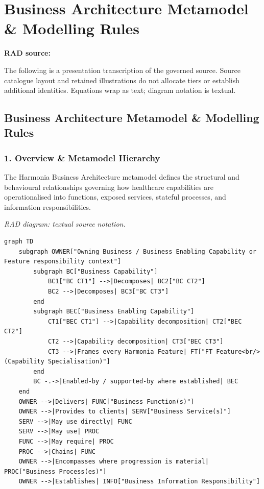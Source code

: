 \chapter{Business Architecture Metamodel \& Modelling Rules}\label{rad:metamodel}
\noindent\textbf{RAD source:} \texttt{}

The following is a presentation transcription of the governed source. Source catalogue layout and retained illustrations do not allocate tiers or establish additional identities. Equations wrap as text; diagram notation is textual.

\label{rad:metamodel:1}
\section*{Business Architecture Metamodel \& Modelling Rules}
\label{rad:metamodel:3}
\subsection*{1. Overview \& Metamodel Hierarchy}
\label{rad:metamodel:5}

The Harmonia Business Architecture metamodel defines the structural and behavioural relationships governing how healthcare capabilities are operationalised into functions, exposed services, stateful processes, and information responsibilities.

\label{rad:metamodel:7}

\textit{RAD diagram: textual source notation.}
\begin{Verbatim}[breaklines,fontsize=\footnotesize]
graph TD
    subgraph OWNER["Owning Business / Business Enabling Capability or Feature responsibility context"]
        subgraph BC["Business Capability"]
            BC1["BC CT1"] -->|Decomposes| BC2["BC CT2"]
            BC2 -->|Decomposes| BC3["BC CT3"]
        end
        subgraph BEC["Business Enabling Capability"]
            CT1["BEC CT1"] -->|Capability decomposition| CT2["BEC CT2"]
            CT2 -->|Capability decomposition| CT3["BEC CT3"]
            CT3 -->|Frames every Harmonia Feature| FT["FT Feature<br/>(Capability Specialisation)"]
        end
        BC -.->|Enabled-by / supported-by where established| BEC
    end
    OWNER -->|Delivers| FUNC["Business Function(s)"]
    OWNER -->|Provides to clients| SERV["Business Service(s)"]
    SERV -->|May use directly| FUNC
    SERV -->|May use| PROC
    FUNC -->|May require| PROC
    PROC -->|Chains| FUNC
    OWNER -->|Encompasses where progression is material| PROC["Business Process(es)"]
    OWNER -->|Establishes| INFO["Business Information Responsibility"]
\end{Verbatim}
\label{rad:metamodel:31}


